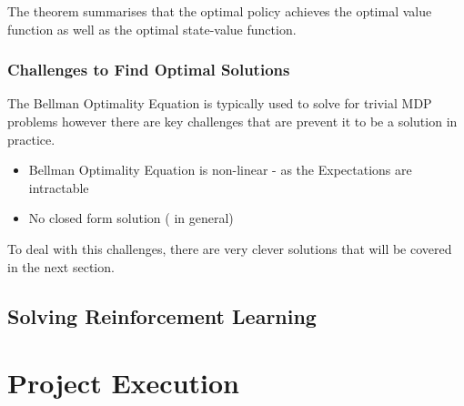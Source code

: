 \documentclass[ %
                    author={Ashwinder Khurana},
                supervisor={Prof Dave Cliff},
                    degree={MEng},
                     title={The Deeply Reinforced Trader},
                  subtitle={},
                      type={enterprise},
                      year={2020} ]{dissertation}
\begin{document}
{The theorem \cite{MDP-theorem RL Course by David Silver - Lecture 2: Markov Decision Process} summarises that the optimal policy achieves the optimal value function as well as the optimal state-value function. 

\subsection{Challenges to Find Optimal Solutions}
The Bellman Optimality Equation is typically used to solve for trivial MDP problems however there are key challenges that are prevent it to be a solution in practice. 

\begin{itemize}
\item Bellman Optimality Equation is non-linear - as the Expectations are intractable 
\item No closed form solution ( in general)
\end{itemize}


To deal with this challenges, there are very clever solutions that will be covered in the next section.

\section{Solving Reinforcement Learning}






\chapter{Project Execution}
\label{chap:execution}

}
\end{document}
